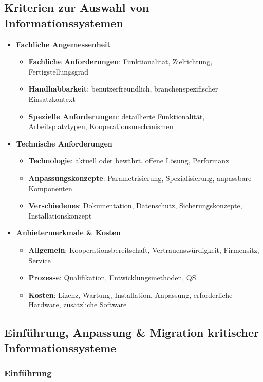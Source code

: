 \documentclass{article}
\begin{document}
\subsection{Kriterien zur Auswahl von Informationssystemen}
\begin{itemize}
  \item \textbf{Fachliche Angemessenheit}
        \begin{itemize}
          \item \textbf{Fachliche Anforderungen}: Funktionalität, Zielrichtung, Fertigstellungsgrad
          \item \textbf{Handhabbarkeit}: benutzerfreundlich, branchenspezifischer Einsatzkontext
          \item \textbf{Spezielle Anforderungen}: detaillierte Funktionalität, Arbeitsplatztypen, Kooperationsmechanismen
        \end{itemize}
  \item \textbf{Technische Anforderungen}
        \begin{itemize}
          \item \textbf{Technologie}: aktuell oder bewährt, offene Lösung, Performanz
          \item \textbf{Anpassungskonzepte}: Parametrisierung, Spezialisierung, anpassbare Komponenten
          \item \textbf{Verschiedenes}: Dokumentation, Datenschutz, Sicherungskonzepte, Installationskonzept
        \end{itemize}
  \item \textbf{Anbietermerkmale \& Kosten}
        \begin{itemize}
          \item \textbf{Allgemein}: Kooperationsbereitschaft, Vertrauenswürdigkeit, Firmensitz, Service
          \item \textbf{Prozesse}: Qualifikation, Entwicklungsmethoden, QS
          \item \textbf{Kosten}: Lizenz, Wartung, Installation, Anpassung, erforderliche Hardware, zusätzliche Software
        \end{itemize}
\end{itemize}

\subsection{Einführung, Anpassung \& Migration kritischer Informationssysteme}

\subsubsection{Einführung}
\end{document}
